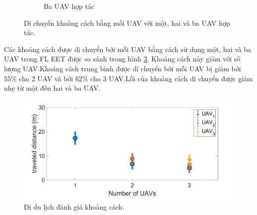 \documentclass[11pt,openany]{book}
\begin{document}
\begin{algorimth}[H]
\begin{figure}[H]
\begin{subfigure}[H]{0.7\linewidth}
        \caption{{Ba UAV hợp tác}}
        \label{fig:3.20c}
    \end{subfigure}
    \caption{Di chuyển khoảng cách bằng mỗi UAV với một, hai và ba UAV hợp tác.}
    \label{fig:3.20}
\end{figure}
Các khoảng cách được di chuyển bởi mỗi UAV bằng cách sử dụng một, hai và ba UAV trong FL EET được so sánh trong hình \ref{fig:3.21}. Khoảng cách này giảm với số lượng UAV.Khoảng cách trung bình được di chuyển bởi mỗi UAV bị giảm bởi $55\%$ cho 2 UAV và bởi $62\%$ cho 3 UAV.Lỗi của khoảng cách di chuyển được giảm nhẹ từ một đến hai và ba UAV.
\begin{figure}[H]
    \centering
    \includegraphics[scale=0.4]{assets/3_21.png}
    \caption{Đi du lịch đánh giá khoảng cách.}
    \label{fig:3.21}
\end{figure}

\end{algorimth}
\end{document}
